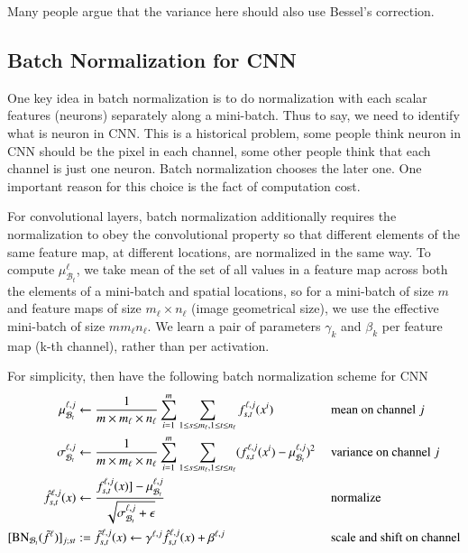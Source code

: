 Many people argue that the variance here should also use Bessel's correction.

\subsection{Batch Normalization for CNN}
One key idea in batch normalization is to do normalization with each scalar features (neurons) 
separately along a mini-batch. 
Thus to say, we need to identify what is neuron in CNN. 
This is a historical problem, some people think neuron in CNN
should be the pixel in each channel, some other people think that each channel is just 
one neuron. Batch normalization chooses the later one. 
One important reason for this choice is the fact of computation cost. 

For convolutional layers, batch normalization additionally requires the normalization
to  obey the convolutional property so that different elements
of the same feature map, at different locations, are normalized in the
same way. 
To compute $\mu^\ell_{\mathcal B_t}$, we take mean of the set of all values in a feature map across both the
elements of a mini-batch and spatial locations, so for a mini-batch
of size $m$ and feature maps of size $m_\ell \times n_\ell$ (image geometrical size), 
we use the effective mini-batch of size $ m m_\ell n_\ell$. 
We learn a pair of parameters $\gamma_k$ and $\beta_k$ per feature map (k-th channel), rather than per activation.


For simplicity, then have the following batch normalization scheme for CNN
\begin{equation}\label{def:BNeq-traningCNN}
\begin{aligned}
\mu^{\ell, j}_{\mathcal B_t} & \leftarrow \frac{1}{m \times m_\ell \times n_\ell }\sum_{i=1}^m \sum_{1\le s\le m_\ell, 1\le t \le n_\ell} f^{\ell, j}_{s,t}(x^i)
 &&\text{ mean on channel }j \\
\sigma^{\ell, j}_{\mathcal B_t} & \leftarrow \frac{1}{m \times m_\ell \times n_\ell }\sum_{i=1}^m \sum_{1\le s\le m_\ell, 1\le t \le n_\ell}
 (f^{\ell, j}_{s,t}(x^i) - \mu^{\ell, j}_{\mathcal B_t})^2   &&\text{ variance on channel }j\\
\hat f^{\ell, j}_{s,t} (x) & \leftarrow \frac{f^{\ell, j}_{s, t}(x)] - \mu^{\ell, j}_{\mathcal B_t}}{\sqrt{\sigma^{\ell, j}_{\mathcal B_t} +\epsilon}}   &&\text{ normalize }\\
[{\rm BN}_{\mathcal B_t}(\tilde f^{\ell})]_{j;st} &:= \tilde f^{\ell, j}_{s,t}(x)  \leftarrow \gamma^{\ell,j} \hat f^{\ell, j}_{s,t} (x)  + \beta^{\ell,j} 
&&\text{ scale and shift on channel}
\end{aligned}
\end{equation}

